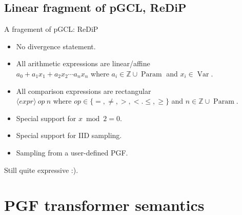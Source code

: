 \documentclass[8pt]{beamer}
\DeclareMathOperator*{\VARS}{Var}
\DeclareMathOperator*{\PARMS}{Param}
\begin{document}
\subsection{Linear fragment of pGCL, ReDiP}
\begin{frame}{A fragement of pGCL: ReDiP}
	\begin{itemize}
		\item No divergence statement.
		\item All arithmetic expressions are linear/affine\\
		      \( a_0 + a_1 x_1 + a_2 x_2 \cdots a_n x_n \)
		      where \( a_i \in \mathbb{Z} \cup \PARMS \) and \( x_i \in \VARS \).
		\item All comparison expressions are rectangular\\
		      \(\langle expr \rangle\ op\ n\)
		      where \(op \in \{=,\neq,>,<.\leq,\geq\}\) and \(n\in \mathbb{Z}\cup\PARMS\).
		\item Special support for \(x \bmod 2 = 0\).
		\item Special support for IID sampling.
		\item Sampling from a user-defined PGF.
	\end{itemize}
	\hfill
	Still quite expressive :).
\end{frame}

\section{PGF transformer semantics}
\end{document}
